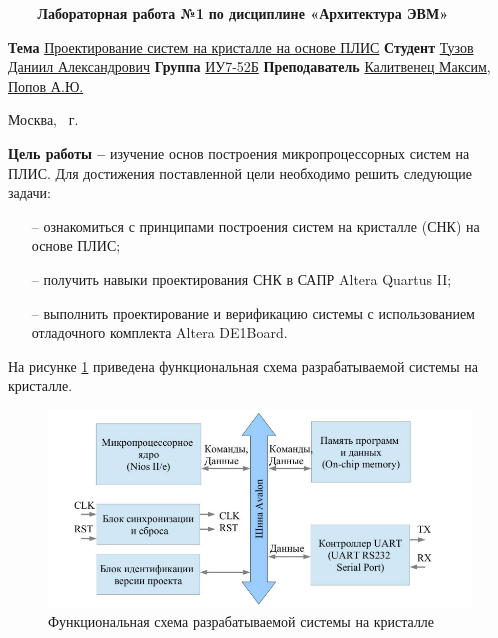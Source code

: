 \documentclass{article}
\begin{document}
\begin{titlepage}
	\noindent\begin{minipage}{1.0\textwidth}\centering
		\Large\textbf{   ~~~ Лабораторная работа №1}\newline
		\textbf{по дисциплине «Архитектура ЭВМ»}\newline\newline\newline\newline\newline
	\end{minipage}

	\noindent\textbf{Тема} \underline{Проектирование систем на кристалле на основе ПЛИС}\newline\newline
	\textbf{Студент} \underline{Тузов Даниил Александрович}\newline\newline
	\textbf{Группа} \underline{ИУ7-52Б}\newline\newline
	\textbf{Преподаватель} \underline{Калитвенец Максим, Попов А.Ю.}
	
	\begin{center}
		\vfill
		Москва, \the\year ~г.
	\end{center}
	\restoregeometry
	\clearpage
\end{titlepage}

\textbf{Цель работы --} изучение основ построения микропроцессорных систем на ПЛИС. 
Для достижения поставленной цели необходимо решить следующие задачи:
\begin{itemize}
	\item[--] ознакомиться с принципами построения систем на кристалле (СНК) на основе ПЛИС;
	\item[--] получить навыки проектирования СНК в САПР Altera Quartus II;
	\item[--] выполнить проектирование и верификацию системы с использованием отладочного  комплекта Altera 
	DE1Board.
\end{itemize}

На рисунке \ref{fscheme} приведена функциональная схема разрабатываемой системы на кристалле.

\begin{figure}[h]
	\centering
	\includegraphics[scale=1]{tools/func_scheme.png}
	\caption{Функциональная схема разрабатываемой системы на кристалле}
	\label{fscheme}
\end{figure}
\end{document}
